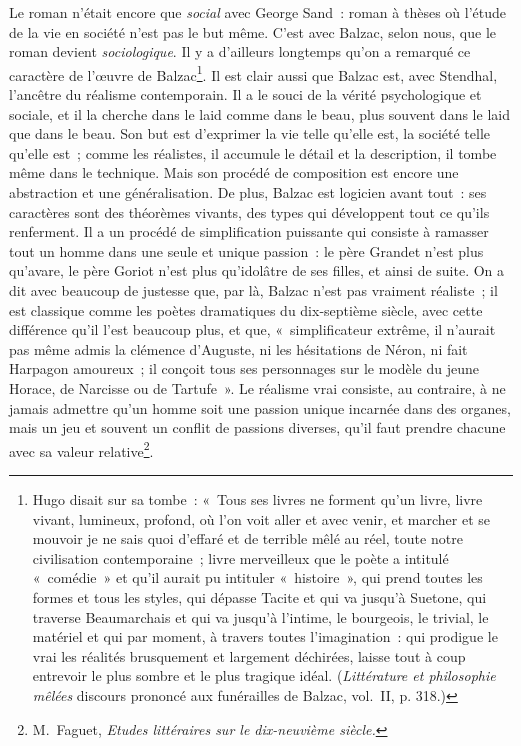 \documentclass[french,twoside]{book} %
\begin{document}
Le roman n’était encore que \emph{social} avec George Sand : roman à thèses où l’étude de la vie en société n’est pas le but même. C’est avec Balzac, selon nous, que le roman devient \emph{sociologique}. Il y a d’ailleurs longtemps qu’on a remarqué ce caractère de l’œuvre de Balzac\footnote{ Hugo disait sur sa tombe : « Tous ses livres ne forment qu’un livre, livre vivant, lumineux, profond, où l’on voit aller et avec venir, et marcher et se mouvoir je ne sais quoi d’effaré et de terrible mêlé au réel, toute notre civilisation contemporaine ; livre merveilleux que le poète a intitulé « comédie » et qu’il aurait pu intituler « histoire », qui prend toutes les formes et tous les styles, qui dépasse Tacite et qui va jusqu’à Suetone, qui traverse Beaumarchais et qui va jusqu’à l’intime, le bourgeois, le trivial, le matériel et qui par moment, à travers toutes l’imagination : qui prodigue le vrai les réalités brusquement et largement déchirées, laisse tout à coup entrevoir le plus sombre et le plus tragique idéal. (\emph{Littérature et philosophie mêlées} discours prononcé aux funérailles de Balzac, vol. II, p. 318.)}. Il est clair aussi que Balzac est, avec Stendhal, l’ancêtre du réalisme contemporain. Il a le souci de la vérité psychologique et sociale, et il la cherche dans le laid comme dans le beau, plus souvent dans le laid que dans le beau. Son but est d’exprimer la vie telle qu’elle est, la société telle qu’elle est ; comme les réalistes, il accumule le détail et la description, il tombe même dans le technique. Mais son procédé de composition est encore une abstraction et une généralisation. De plus, Balzac est logicien avant tout : ses caractères sont des théorèmes vivants, des types qui développent tout ce qu’ils renferment. Il a un procédé de simplification puissante qui consiste à ramasser tout un homme dans une seule et unique passion : le père Grandet n’est plus qu’avare, le père Goriot n’est plus qu’idolâtre de ses filles, et ainsi de suite. On a dit avec beaucoup de justesse que, par là, Balzac n’est pas vraiment réaliste ; il est classique comme les poètes dramatiques du dix-septième siècle, avec cette différence qu’il l’est beaucoup plus, et que, « simplificateur extrême, il n’aurait pas même admis la clémence d’Auguste, ni les hésitations de Néron, ni fait Harpagon amoureux ; il conçoit tous ses personnages sur le modèle du jeune Horace, de Narcisse ou de Tartufe ». Le réalisme vrai consiste, au contraire, à ne jamais admettre qu’un homme soit une passion unique incarnée dans des organes, mais un jeu et souvent un conflit de passions diverses, qu’il faut prendre chacune avec sa valeur relative\footnote{ M. Faguet, \emph{Etudes littéraires sur le dix-neuvième siècle.}}.\par
\end{document}
